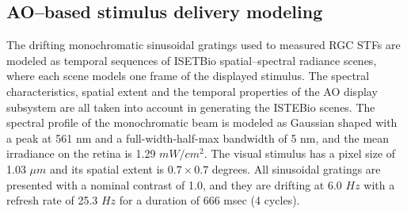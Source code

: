 \documentclass[11pt, oneside]{article}   	%
\begin{document}
\subsection{AO--based stimulus delivery modeling}
The drifting monochromatic sinusoidal gratings used to measured RGC STFs are modeled as temporal sequences of ISETBio spatial--spectral radiance scenes, where each scene models one frame of the displayed stimulus. The spectral characteristics, spatial extent and the temporal properties of the AO display subsystem are all taken into account in generating the ISTEBio scenes. The spectral profile of the monochromatic beam is modeled as Gaussian shaped with a peak at 561 nm and a full-width-half-max bandwidth of 5 nm, and the mean irradiance on the retina is 1.29 $mW / cm^2$. The visual stimulus has a pixel size of 1.03 $\mu m$ and its spatial extent is $0.7 \times 0.7$ degrees. All sinusoidal gratings are presented with a nominal contrast of 1.0, and they are drifting at 6.0 $Hz$ with a refresh rate of 25.3 $Hz$ for a duration of 666 msec (4 cycles). 
\end{document}
